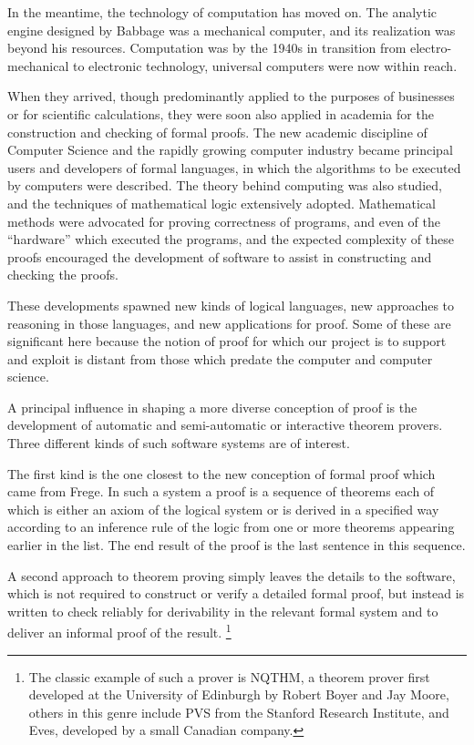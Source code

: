 In the meantime, the technology of computation has moved on.
The analytic engine designed by Babbage was a mechanical computer, and
its realization was beyond his resources.
Computation was by the 1940s in transition from electro-mechanical to
electronic technology, universal computers were now within reach.

When they arrived, though predominantly applied to the purposes of
businesses or for scientific calculations, they were soon also applied
in academia for the construction and checking of formal proofs.
The new academic discipline of Computer Science and the rapidly
growing computer industry became principal users and developers of
formal languages, in which the algorithms to be executed by computers
were described.
The theory behind computing was also studied, and the techniques of
mathematical logic extensively adopted.
Mathematical methods were advocated for proving correctness of
programs, and even of the ``hardware'' which executed the programs,
and the expected complexity of these proofs encouraged the development
of software to assist in constructing and checking the proofs.

These developments spawned new kinds of logical languages, new
approaches to reasoning in those languages, and new applications for
proof.
Some of these are significant here because the notion of proof for
which our project is to support and exploit is distant from those
which predate the computer and computer science.

A principal influence in shaping a more diverse conception of proof is
the development of automatic and semi-automatic or interactive theorem
provers.
Three different kinds of such software systems are of interest.

The first kind is the one closest to the new conception of formal
proof which came from Frege.
In such a system a proof is a sequence of theorems each of which is
either an axiom of the logical system or is derived in a specified way
according to an inference rule of the logic from one or more theorems
appearing earlier in the list.
The end result of the proof is the last sentence in this sequence.

A second approach to theorem proving simply leaves the details to the
software, which is not required to construct or verify a detailed
formal proof, but instead is written to check reliably for
derivability in the relevant formal system and to deliver an informal
proof of the result.%
\footnote{The classic example of such a prover is NQTHM, a theorem
  prover first developed at the University of Edinburgh by Robert
  Boyer and Jay Moore, others in this genre include PVS from the
  Stanford Research Institute, and Eves, developed by a small Canadian
company.}

